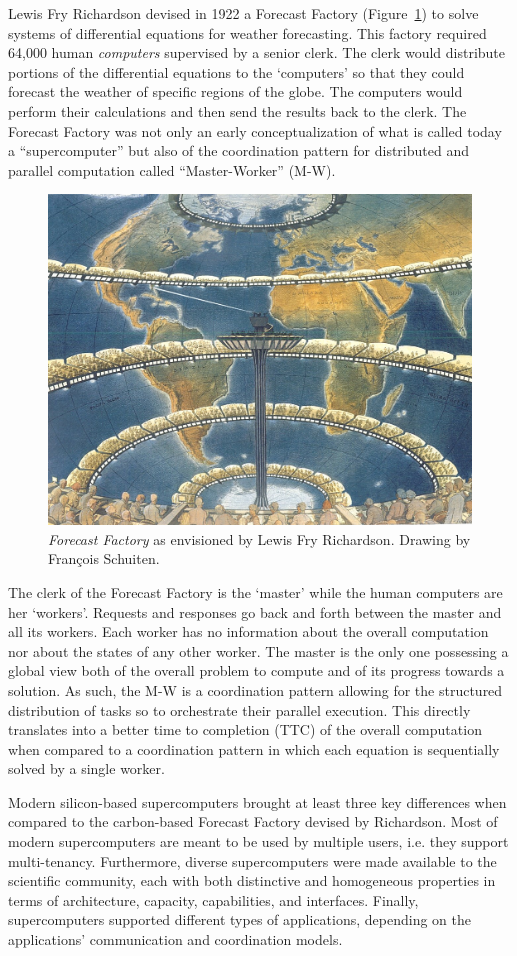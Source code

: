 \documentclass{sig-alternate}
\begin{document}
Lewis Fry Richardson devised in 1922 a Forecast Factory
(Figure~\ref{fig:figures_forecast-factory}) to solve systems of differential
equations for weather forecasting. This factory required 64,000 human
\textit{computers} supervised by a senior clerk. The clerk would distribute
portions of the differential equations to the `computers' so that they could
forecast the weather of specific regions of the globe. The computers would
perform their calculations and then send the results back to the clerk. The
Forecast Factory was not only an early conceptualization of what is called
today a ``supercomputer'' but also of the coordination pattern for distributed
and parallel computation called ``Master-Worker'' (M-W).

\begin{figure}[t]
  \centering
    \includegraphics[width=.45\textwidth]{figures/forecast-factory.jpg}
  \caption{\textit{Forecast Factory} as envisioned by Lewis Fry Richardson.
    Drawing by Fran{\c c}ois Schuiten.}
  \label{fig:figures_forecast-factory}
\end{figure}

The clerk of the Forecast Factory is the `master' while the human computers are
her `workers'. Requests and responses go back and forth between the master and
all its workers. Each worker has no information about the overall computation
nor about the states of any other worker. The master is the only one possessing
a global view both of the overall problem to compute and of its progress
towards a solution. As such, the M-W is a coordination pattern allowing for the
structured distribution of tasks so to orchestrate their parallel execution.
This directly translates into a better time to completion (TTC) of the overall
computation when compared to a coordination pattern in which each equation is
sequentially solved by a single worker.

Modern silicon-based supercomputers brought at least three key differences when
compared to the carbon-based Forecast Factory devised by Richardson. Most of
modern supercomputers are meant to be used by multiple users, i.e. they support
multi-tenancy. Furthermore, diverse supercomputers were made available to the
scientific community, each with both distinctive and homogeneous properties in
terms of architecture, capacity, capabilities, and interfaces. Finally,
supercomputers supported different types of applications, depending on the
applications' communication and coordination models.
\end{document}
